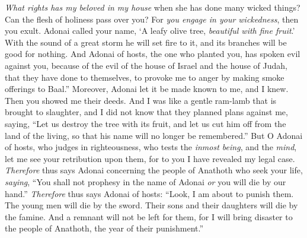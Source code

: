 \begin{biblechapter}
\verse \textit{What rights has my beloved in my house} 
when she has done many wicked things? 
Can the flesh of holiness pass over you? 
For \textit{you engage in your wickedness}, then you exult.
\verse Adonai called your name, ‘A leafy olive tree, \textit{beautiful with fine fruit}.’ 
With the sound of a great storm he will set fire to it, 
and its branches will be good for nothing.
\verse And Adonai of hosts, the one who planted you, 
has spoken evil against you, 
because of the evil of the house of Israel and the house of Judah, 
that they have done to themselves, 
to provoke me to anger by making smoke offerings to Baal.”
 Moreover, Adonai let it be made known to me, and I knew. 
Then you showed me their deeds.
\verse And I was like a gentle ram-lamb that is brought to slaughter, 
and I did not know that they planned plans against me, saying, 
“Let us destroy the tree with its fruit, 
and let us cut him off from the land of the living, 
so that his name will no longer be remembered.”
\verse But O Adonai of hosts, who judges in righteousness, 
who tests the \textit{inmost being}, and the \textit{mind}, 
let me see your retribution upon them, 
for to you I have revealed my legal case.
\verse \textit{Therefore} thus says Adonai concerning the people of Anathoth who seek your life, \textit{saying}, “You shall not prophesy in the name of Adonai \textit{or} you will die by our hand.”
\verse \textit{Therefore} thus says Adonai of hosts: “Look, I am about to punish them. The young men will die by the sword. Their sons and their daughters will die by the famine.
\verse And a remnant will not be left for them, for I will bring disaster to the people of Anathoth, the year of their punishment.”
\end{biblechapter}

